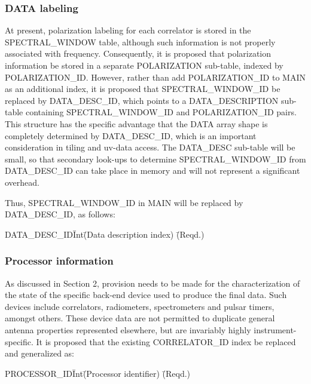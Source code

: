 \documentclass{article}
\begin{document}
\subsubsection{DATA labeling}

At present, polarization labeling for each correlator is stored in the
SPECTRAL\_WINDOW table, although such information is not properly
associated with frequency. Consequently, it is proposed that
polarization information be stored in a separate POLARIZATION
sub-table, indexed by POLARIZATION\_ID. However, rather than add
POLARIZATION\_ID to MAIN as an additional index, it is proposed that
SPECTRAL\_WINDOW\_ID be replaced by DATA\_DESC\_ID, which points to a
DATA\_DESCRIPTION sub-table containing SPECTRAL\_WINDOW\_ID and
POLARIZATION\_ID pairs. This structure has the specific advantage that
the DATA array shape is completely determined by DATA\_DESC\_ID, which
is an important consideration in tiling and uv-data access. The
DATA\_DESC sub-table will be small, so that secondary look-ups to
determine SPECTRAL\_WINDOW\_ID from DATA\_DESC\_ID can take place in
memory and will not represent a significant overhead.

Thus, SPECTRAL\_WINDOW\_ID in MAIN will be replaced by DATA\_DESC\_ID,
as follows:

\begin{tabbing}
DATA\_DESC\_ID\quad\quad \= Int\quad\quad \= (Data description index)
 \quad\quad \= (Reqd.) \\
\end{tabbing}

\subsubsection{Processor information}

As discussed in Section 2, provision needs to be made for the
characterization of the state of the specific back-end device used to
produce the final data. Such devices include correlators, radiometers,
spectrometers and pulsar timers, amongst others. These device data are not
permitted to duplicate general antenna properties represented
elsewhere, but are invariably highly instrument-specific. It is
proposed that the existing CORRELATOR\_ID index be replaced and
generalized as:

\begin{tabbing}
PROCESSOR\_ID\quad\quad \= Int\quad\quad \= (Processor identifier)
 \quad\quad \= (Reqd.) \\
\end{tabbing} 
\end{document}

